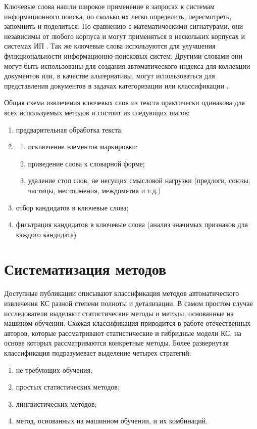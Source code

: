 Ключевые слова нашли широкое применение в запросах к системам информационного поиска, по сколько их легко определить, пересмотреть, запомнить и поделиться.
По сравнению с математическими сигнатурами, они независимы от любого корпуса и могут применяться в нескольких корпусах и системах ИП \cite{5}.
Так же ключевые слова используются для улучшения функциональности информационно-поисковых систем.
Другими словами они могут быть использованы для создания автоматического индекса для коллекции документов или, в качестве альтернативы, могут использоваться для представления документов в задачах категоризации или классификации \cite{1}.

Общая схема извлечения ключевых слов из текста практически одинакова для всех используемых методов и состоит из следующих шагов:
\begin{enumerate}
	\item предварительная обработка текста:
	\item \begin{enumerate}
		\item исключение элементов маркировки;
		\item приведение слова к словарной форме;
		\item удаление стоп слов, не несущих смысловой нагрузки (предлоги, союзы, частицы, местоимения, междометия и т.д.)
	\end{enumerate}
	\item отбор кандидатов в ключевые слова;
	\item фильтрация кандидатов в ключевые слова (анализ значимых признаков для каждого кандидата)
\end{enumerate}

\section{Систематизация методов}
Доступные публикации описывают классификация методов автоматического извлечения КС разной степени полноты и детализации. 
В самом простом случае исследователи выделяют статистические методы и методы, основанные на машином обучении.
Схожая классификация приводится в работе отечественных авторов, которые рассматривают статистические и гибридные модели КС, на основе которых рассматриваются конкретные методы. 
Более развернутая классификация подразумевает выделение четырех стратегий:
\begin{enumerate}
	\item не требующих обучения; 
	\item простых статистических методов;
	\item лингвистических методов;
	\item метод, основанных на машинном обучении, и их комбинаций.
\end{enumerate}

